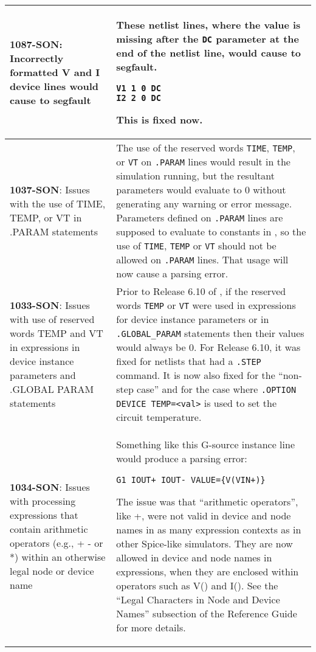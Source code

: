 {\begin{longtable}[h] {>{\raggedright\small}m{2in}|>{\raggedright\let\\\tabularnewline\small}m{3.5in}}
\textbf{1087-SON}: Incorrectly formatted V and I device lines would cause \Xyce{} to segfault  &
 These netlist lines, where the value is missing after the \texttt{DC}
 parameter at the end of the netlist line, would cause \Xyce{} to
 segfault.
\begin{verbatim}
V1 1 0 DC
I2 2 0 DC
\end{verbatim}
This is fixed now.  \\ \hline

\textbf{1037-SON}: Issues with the use of TIME, TEMP, or VT in .PARAM statements &
The use of the reserved words \texttt{TIME}, \texttt{TEMP}, or \texttt{VT} on
\texttt{.PARAM} lines would result in the simulation running, but the resultant
parameters would evaluate to 0 without generating any warning or error message.
Parameters defined on \texttt{.PARAM} lines are supposed to evaluate to
constants in \Xyce{}, so the use of \texttt{TIME}, \texttt{TEMP} or \texttt{VT}
should not be allowed on \texttt{.PARAM} lines.  That usage will now cause a
parsing error.
\\ \hline

\textbf{1033-SON}: Issues with use of reserved words TEMP and VT in expressions
in device instance parameters and .GLOBAL PARAM statements & Prior to Release 6.10
of \Xyce{}, if the reserved words \texttt{TEMP} or \texttt{VT} were used in
expressions for device instance parameters or in \texttt{.GLOBAL\_PARAM}
statements then their values would always be 0.  For Release 6.10, it was fixed
for netlists that had a \texttt{.STEP} command.  It is now also fixed for the
``non-step case'' and for the case where \texttt{.OPTION DEVICE TEMP=<val>}
is used to set the circuit temperature.
\\ \hline

\textbf{1034-SON}: Issues with processing expressions that contain arithmetic
operators (e.g., + - or *) within an otherwise legal node or device name &
Something like this G-source instance line would produce a parsing error:
\begin{verbatim}
G1 IOUT+ IOUT- VALUE={V(VIN+)}
\end{verbatim}
The issue was that ``arithmetic operators'', like +, were not valid in
device and node names in as many expression contexts as in other
Spice-like simulators.  They are now allowed in device and node names
in expressions, when they are enclosed within \Xyce{} operators such
as V() and I().  See the ``Legal Characters in Node and Device Names''
subsection of the \Xyce{} Reference Guide for more details.
\\ \hline


\end{longtable}}
